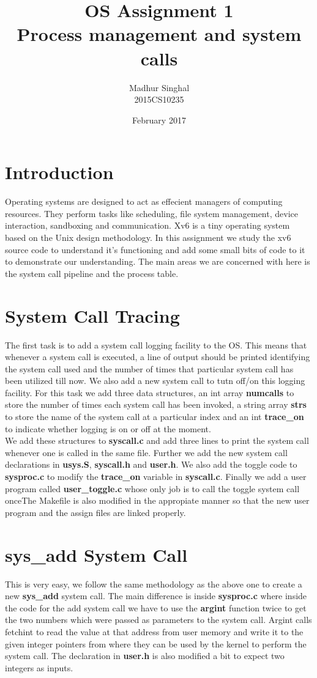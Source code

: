 \documentclass[12pt,a4paper]{article}
\author{Madhur Singhal\\2015CS10235}
\title{OS Assignment 1\\Process management and system calls}
\date{February 2017}
\begin{document}
\maketitle
\section{Introduction}
Operating systems are designed to act as effecient managers of computing resources. They perform tasks like scheduling, file system management, device interaction, sandboxing and communication. Xv6 is a tiny operating system based on the Unix design methodology. In this assignment we study the xv6 source code to understand it's functioning and add some small bits of code to it to demonstrate our understanding. The main areas we are concerned with here is the system call pipeline and the process table.
\section{System Call Tracing}
The first task is to add a system call logging facility to the OS. This means that whenever a system call is executed, a line of output should be printed identifying the system call used and the number of times that particular system call has been utilized till now. We also add a new system call to tutn off/on this logging facility. For this task we add three data structures, an int array \textbf{numcalls} to store the number of times each system call has been invoked, a string array \textbf{strs} to store the name of the system call at a particular index and an int \textbf{trace\_on} to indicate whether logging is on or off at the moment.\\
We add these structures to \textbf{syscall.c} and add three lines to print the system call whenever one is called in the same file. Further we add the new system call declarations in \textbf{usys.S}, \textbf{syscall.h} and \textbf{user.h}. We also add the toggle code to \textbf{sysproc.c} to modify the \textbf{trace\_on} variable in \textbf{syscall.c}. Finally we add a user program called \textbf{user\_toggle.c} whose only job is to call the toggle system call onceThe Makefile is also modified in the appropiate manner so that the new user program  and the assign files are linked properly. \\
\section{sys\_add System Call}
This is very easy, we follow the same methodology as the above one to create a new \textbf{sys\_add} system call. The main difference is inside \textbf{sysproc.c} where inside the code for the add system call we have to use the \textbf{argint} function twice to get the two numbers which were passed as parameters to the system call. Argint calls fetchint to read the value at that address from user memory and write it to the given integer pointers from where they can be used by the kernel to perform the system call. The declaration in \textbf{user.h} is also modified a bit to expect two integers as inputs.
\end{document}
